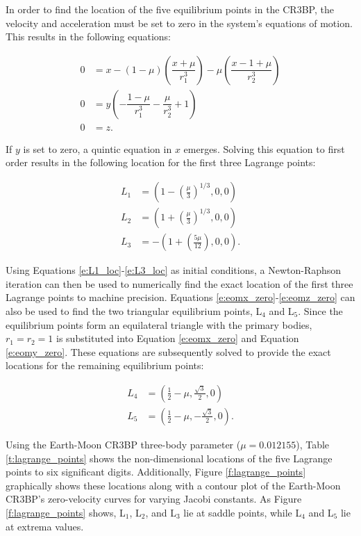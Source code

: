 \documentclass[11pt]{article} %
\begin{document}
In order to find the location of the five equilibrium points in the CR3BP, the velocity and acceleration must be set to zero in the system's equations of motion. This results in the following equations:

\begin{align}
	0 & = x - (1-\mu)\left(\dfrac{x+\mu}{r_1^3}\right) - \mu\left(\dfrac{x-1+\mu}{r_2^3}\right) \label{e:eomx_zero}\\
	0 & = y\left(-\dfrac{1-\mu}{r_1^3} - \dfrac{\mu}{r_2^3} + 1\right) \label{e:eomy_zero}\\
	0 & = z. \label{e:eomz_zero}
\end{align}

\noindent
If $y$ is set to zero, a quintic equation in $x$ emerges. Solving this equation to first order results in the following location for the first three Lagrange points:

\begin{align}
	L_1 &= \left(1-\left(\frac{\mu}{3}\right)^{1/3},0,0\right)\label{e:L1_loc}\\
	L_2 &= \left(1+\left(\frac{\mu}{3}\right)^{1/3},0,0\right)\label{e:L2_loc}\\
	L_3 &= -\left(1+\left(\frac{5\mu}{12}\right),0,0\right). \label{e:L3_loc}
\end{align}

\noindent
Using Equations \ref{e:L1_loc}-\ref{e:L3_loc} as initial conditions, a Newton-Raphson iteration can then be used to numerically find the exact location of the first three Lagrange points to machine precision. Equations \ref{e:eomx_zero}-\ref{e:eomz_zero} can also be used to find the two triangular equilibrium points, L$_4$ and L$_5$. Since the equilibrium points form an equilateral triangle with the primary bodies, $r_1 = r_2 = 1$ is substituted into Equation \ref{e:eomx_zero} and Equation \ref{e:eomy_zero}. These equations are subsequently solved to provide the exact locations for the remaining equilibrium points:

\begin{align}
	L_4 &= \left(\frac{1}{2}-\mu, \frac{\sqrt{3}}{2},0\right)\\
	L_5 &= \left(\frac{1}{2}-\mu, -\frac{\sqrt{3}}{2},0\right).
\end{align}

\noindent
Using the Earth-Moon CR3BP three-body parameter ($\mu = 0.012155$), Table \ref{t:lagrange_points} shows the non-dimensional locations of the five Lagrange points to six significant digits. Additionally, Figure \ref{f:lagrange_points} graphically shows these locations along with a contour plot of the Earth-Moon CR3BP's zero-velocity curves for varying Jacobi constants. As Figure \ref{f:lagrange_points} shows, L$_1$, L$_2$, and L$_3$ lie at saddle points, while L$_4$ and L$_5$ lie at extrema values.
\end{document}
